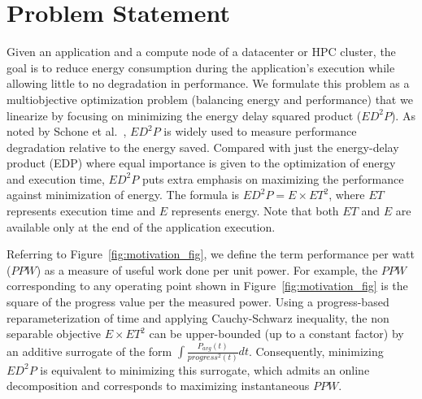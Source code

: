 \section{Problem Statement} \label{ch4:sec:Problem}
Given an application and a compute node of a datacenter or HPC cluster, the goal is to reduce energy consumption during the application's execution while allowing little to no degradation in performance. We formulate this problem as a multiobjective optimization problem (balancing energy and performance) that we linearize by focusing on minimizing the energy delay squared product ($ED^2P$).
%
As noted by Schone et al.~\cite{schone2014tools}, $ED^2P$ is widely used to measure performance degradation relative to the energy saved.
Compared with just the energy-delay product (EDP) where equal importance is given to the optimization of energy and execution time, $ED^2P$ puts extra emphasis on maximizing the performance against minimization of energy. The formula is $ED^2P = E \times ET^2 $, where $ET$ represents execution time and $E$ represents energy. Note that both $ET$ and $E$ are  available only at the end of the application execution.

Referring to Figure~\ref{fig:motivation_fig}, we define the term performance per watt ($PPW$) as a measure of useful work done per unit power. For example, the $PPW$ corresponding to any operating point shown in Figure~\ref{fig:motivation_fig} is the square of the progress value per the measured power. 
Using a progress-based reparameterization of time and applying Cauchy-Schwarz inequality, the non separable objective $E \times ET^2$ can be upper-bounded (up to a constant factor) by an additive surrogate of the form $\int\frac{P_{avg}(t)}{progress^2(t)}dt$. Consequently, minimizing $ED^2P$ is equivalent to minimizing this surrogate, which admits an online decomposition and corresponds to maximizing instantaneous $PPW$.
%
%
